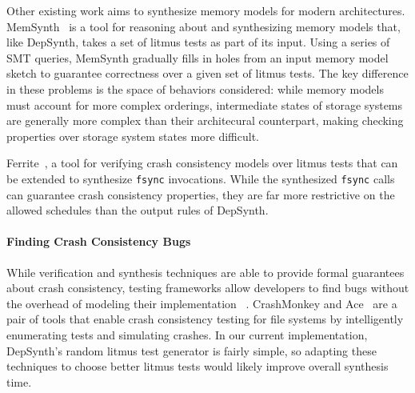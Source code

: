 Other existing work aims to synthesize memory models for modern architectures.
MemSynth~\cite{bornholt:memsynth} is a tool for reasoning about and synthesizing memory
models that, like DepSynth, takes a set of litmus tests as part of its input.
Using a series of SMT queries, MemSynth gradually fills in holes from an
input memory model sketch to guarantee correctness over a given set of
litmus tests.
The key difference in these problems is the space of behaviors considered:
while memory models must account for more complex orderings,
intermediate states of storage systems are generally more complex than their
architecural counterpart, making checking properties over storage system
states more difficult.

Ferrite~\cite{bornholt:ferrite}, a tool for verifying crash consistency models over litmus tests
that can be extended to synthesize \texttt{fsync} invocations.
While the synthesized \texttt{fsync} calls can guarantee crash consistency properties,
they are far more restrictive on the allowed schedules than
the output rules of DepSynth.

\paragraph{Finding Crash Consistency Bugs}
While verification and synthesis techniques are able to provide
formal guarantees about crash consistency, testing frameworks
allow developers to find bugs without the overhead of modeling
their implementation ~\cite{sun:pfscheck,fu:witcher}.
CrashMonkey and Ace~\cite{mohan:crashmonkey} are a pair of tools that
enable crash consistency testing for file systems
by intelligently enumerating tests and simulating crashes.
In our current implementation, DepSynth's random litmus test generator 
is fairly simple, so adapting these techniques to choose better litmus
tests would likely improve overall synthesis time.

\fi
